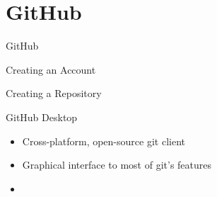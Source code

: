 \documentclass{beamer}
\begin{document}
    \section{GitHub}\label{sec:github}
    \begin{frame}{GitHub}
    \end{frame}

    \begin{frame}{Creating an Account}
    \end{frame}

    \begin{frame}{Creating a Repository}
    \end{frame}

    \begin{frame}{GitHub Desktop}
        \begin{itemize}
            \item Cross-platform, open-source git client
            \item Graphical interface to most of git's features
            \item
        \end{itemize}
    \end{frame}
\end{document}
